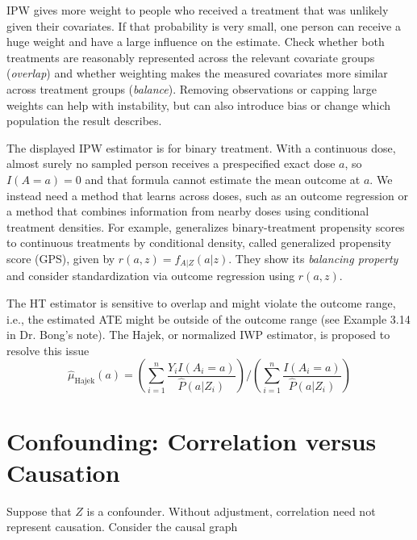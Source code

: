\documentclass[11pt,twoside]{article}
\begin{document}
\begin{remark}
IPW gives more weight to people who received a treatment that was unlikely given their covariates. If that probability is very small, one person can receive a huge weight and have a large influence on the estimate. Check whether both treatments are reasonably represented across the relevant covariate groups (\emph{overlap}) and whether weighting makes the measured covariates more similar across treatment groups (\emph{balance}). Removing observations or capping large weights can help with instability, but can also introduce bias or change which population the result describes.

The displayed IPW estimator is for binary treatment. With a continuous dose, almost surely no sampled person receives a prespecified exact dose $a$, so $I(A=a)=0$ and that formula cannot estimate the mean outcome at $a$. We instead need a method that learns across doses, such as an outcome regression or a method that combines information from nearby doses using conditional treatment densities. For example, \cite{Hirano2004} generalizes binary-treatment propensity scores to continuous treatments by conditional density, called generalized propensity score (GPS), given by $r(a,z) = f_{A|Z}(a|z)$. They show its \emph{balancing property} and consider standardization via outcome regression using $r(a,z)$.
\end{remark}

\begin{remark}
    The HT estimator is sensitive to overlap and might violate the outcome range, i.e., the estimated ATE might be outside of the outcome range (see Example 3.14 in Dr. Bong's note). The Hajek, or normalized IWP estimator, is proposed to resolve this issue
    \begin{equation}
    \label{eq:Hajek}
    \boxed{
    \hat{\mu}_{\mathrm{Hajek}}(a) = \left(\sum_{i=1}^n
\frac{Y_iI(A_i=a)}{\widehat P(a|Z_i)}\right) \big/ \left(\sum_{i=1}^n
\frac{I(A_i=a)}{\widehat P(a|Z_i)}\right)}
\end{equation}
    
\end{remark}


\section{Confounding: Correlation versus Causation}
\label{sec:confounding}

Suppose that $Z$ is a confounder. Without adjustment, correlation
 need not represent causation. Consider the causal graph
\begin{center}
\end{center}
\end{document}
